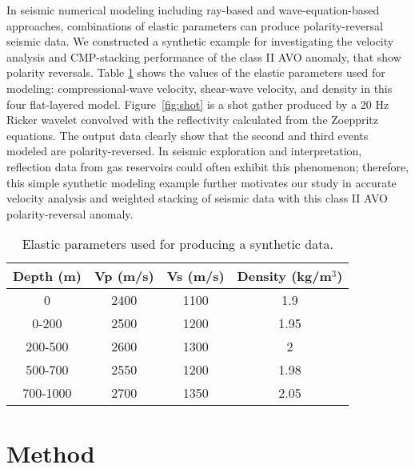 In seismic numerical modeling including ray-based and wave-equation-based approaches, combinations of elastic parameters can produce polarity-reversal seismic data. We constructed a synthetic example for investigating the velocity analysis and CMP-stacking performance of the class II AVO anomaly, that show polarity reversals. Table \ref{tab:parameter} shows the values of the elastic parameters used for modeling: compressional-wave velocity, shear-wave velocity, and density in this four flat-layered model. Figure~\ref{fig:shot} is a shot gather produced by a 20 Hz Ricker wavelet convolved with the reflectivity calculated from the Zoeppritz equations. The output data clearly show that the second and third events modeled are polarity-reversed. In seismic exploration and interpretation, reflection data from gas reservoirs could often exhibit this phenomenon; therefore, this simple synthetic modeling example further motivates our study in accurate velocity analysis and weighted stacking of seismic data with this class II AVO polarity-reversal anomaly.

\begin{table}
	\centering
	\begin{center}
		\begin{tabular}{| c | c | c | c |}
			\hline
			Depth (m) & Vp (m/s) & Vs (m/s) & Density (kg/m$^3$) \\ \hline
			0    & 2400 & 1100 & 1.9 \\ \hline
			0-200  & 2500 & 1200 & 1.95 \\    \hline
			200-500  & 2600 & 1300 & 2 \\ \hline
			500-700  & 2550 & 1200 & 1.98\\    \hline
			700-1000 & 2700 & 1350 & 2.05 \\    \hline
		\end{tabular}	
	\end{center}
	\caption{Elastic parameters used for producing a synthetic data.}\label{tab:parameter}
\end{table}


\section{Method}
